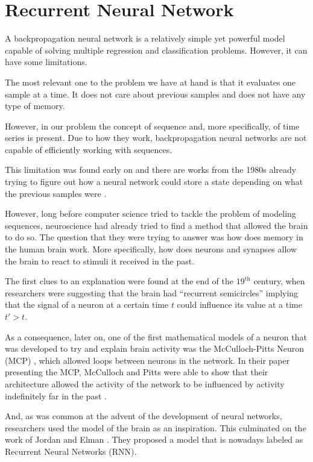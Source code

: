 \section{Recurrent Neural Network}\label{sec:RecurrentNeuralNetwork}

A backpropagation neural network is a relatively simple yet powerful model capable of solving multiple regression \cite{suresh2015particle} and classification \cite{paola1995review} problems.
However, it can have some limitations.

The most relevant one to the problem we have at hand is that it evaluates one sample at a time.
It does not care about previous samples and does not have any type of memory.

However, in our problem the concept of sequence and, more specifically, of time series is present.
Due to how they work, backpropagation neural networks are not capable of efficiently working with sequences.

This limitation was found early on and there are works from the 1980s already trying to figure out how a neural network could store a state depending on what the previous samples were \cite{jordan1986serial}.

However, long before computer science tried to tackle the problem of modeling sequences, neuroscience had already tried to find a method that allowed the brain to do so.
The question that they were trying to answer was how does memory in the human brain work.
More specifically, how does neurons and synapses allow the brain to react to stimuli it received in the past.

The first clues to an explanation were found at the end of the $19^{\text{th}}$ century, when researchers were suggesting that the brain had ``recurrent semicircles'' \cite{espinosa2025importance} implying that the signal of a neuron at a certain time $t$ could influence its value at a time $t' > t$.

As a consequence, later on, one of the first mathematical models of a neuron that was developed to try and explain brain activity was the McCulloch-Pitts Neuron (MCP) \cite{mcculloch1943logical}, which allowed loops between neurons in the network.
In their paper presenting the MCP, McCulloch and Pitts were able to show that their architecture allowed the activity of the network to be influenced by activity indefinitely far in the past \cite{mcculloch1943logical}.

And, as was common at the advent of the development of neural networks, researchers used the model of the brain as an inspiration.
This culminated on the work of Jordan \cite{jordan1986serial} and Elman \cite{elman1990finding}.
They proposed a model that is nowadays labeled as Recurrent Neural Networks (RNN).

